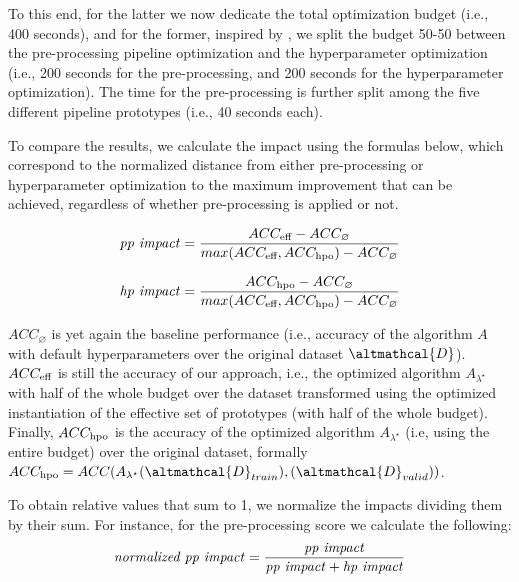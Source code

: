 To this end, for the latter we now dedicate the total optimization budget (i.e., 400 seconds), and for the former, inspired by \cite{Quemy20InfSystems}, we split the budget 50-50 between the pre-processing pipeline optimization and the hyperparameter optimization (i.e., 200 seconds for the pre-processing, and 200 seconds for the hyperparameter optimization).
The time for the pre-processing is further split among the five different pipeline prototypes (i.e., 40 seconds each).

To compare the results, we calculate the impact using the formulas below, which correspond to the normalized distance from either pre-processing or hyperparameter optimization to the maximum improvement that can be achieved, regardless of whether pre-processing is applied or not.

\begin{equation*}
    \text{\textit{pp impact}} = \frac{ACC_{\textup{eff}} - ACC_{\varnothing}}{max(ACC_{\textup{eff}}, ACC_{\textup{hpo}}) - ACC_{\varnothing}}
\end{equation*}

\begin{equation*}
    \text{\textit{hp impact}} = \frac{ACC_{\textup{hpo}} - ACC_{\varnothing}}{max(ACC_{\textup{eff}}, ACC_{\textup{hpo}}) - ACC_{\varnothing}}
\end{equation*}

$ACC_{\varnothing}$ is yet again the baseline performance (i.e., accuracy of the algorithm $A$ with default hyperparameters over the original dataset $\altmathcal{D}$).
$ACC_{\textup{eff}}$ is still the accuracy of our approach, i.e., the optimized algorithm $A_{{\lambda}^{\star}}$ with half of the whole budget over the dataset transformed using the optimized instantiation of the effective set of prototypes (with half of the whole budget).
Finally, $ACC_{\textup{hpo}}$ is the accuracy of the optimized algorithm $A_{{\lambda}^{\star}}$ (i.e, using the entire budget) over the original dataset, formally $ACC_{\textup{hpo}} = ACC(A_{{\lambda}^{\star}}(\altmathcal{D}_{train}), (\altmathcal{D}_{valid}))$.

To obtain relative values that sum to 1, we normalize the impacts dividing them by their sum.
For instance, for the pre-processing score we calculate the following:
\begin{equation*}
    \text{\textit{normalized pp impact}} = \frac{\text{\textit{pp impact}}}
    {\text{\textit{pp impact}} + \text{\textit{hp impact}}}
\end{equation*}


